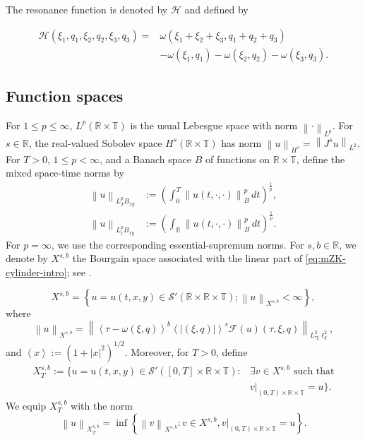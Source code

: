 \documentclass[12pt,oneside,reqno]{amsart}
\numberwithin{equation}{section}
\theoremstyle{plain}
\def\R{{\mathbb R}}
\def\T{{\mathbb T}}
\newcommand{\abs}[1]{%
    \left|#1\right|%
}
\newcommand{\norm}[1]{%
    \left\lVert #1\right\rVert%
}
\newcommand{\inp}[1]{%
    \left\langle #1\right\rangle
}
\newcommand{\brs}[1]{%
    \left\{#1\right\}
}
\newcommand{\Lpn}[2]{%
    \left\lVert #1\right\rVert_{L^{#2}}%
}
\newcommand{\Hn}[2]{%
    \left\lVert #1\right\rVert_{H^{#2}}%
}
\newcommand{\xnorm}[3]{%
    \left\lVert #1\right\rVert_{X^{{#2},{#3}}}%
}
\newcommand{\rt}{\R\times\T}
\newcommand{\rrt}{\R\times\R\times\T}
\newcommand{\F}{\mathcal{F}}
\begin{document}
\smallskip
The resonance function is denoted by $\mathcal{H}$ and defined by

\begin{equation}
    \begin{aligned}
\label{ResonanceFunction}
    \mathcal{H}(\xi_1,q_1,\xi_2,q_2,\xi_3, q_3)=& \omega(\xi_1 + \xi_2 +\xi_3,q_1 +q_2+q_3)\\
    & - \omega(\xi_1,q_1)-\omega( \xi_2,q_2) -\omega(\xi_3,q_3).
\end{aligned}
\end{equation}


\subsection{Function spaces}
For $1\leq p\leq\infty$, $L^p(\R\times\T)$ is the usual Lebesgue space
with norm $\Lpn{\cdot}{p}$. For $s\in\R$, the real-valued Sobolev space
$H^s(\R\times\T)$ has norm $\Hn{u}{s}=\Lpn{J^su}{2}$. For $T>0$,
$1\leq p<\infty$, and a Banach space $B$ of functions on $\R\times\T$,
define the mixed space-time norms by
\begin{equation}
\label{eq:mixed-space-time-norms}
\begin{aligned}
\norm{u}_{L_T^pB_{xy}}
&:=
\left(
    \int_0^T
    \norm{u(t,\cdot,\cdot)}_B^p
    \,dt
\right)^{\frac1p},
\\
\norm{u}_{L_t^pB_{xy}}
&:=
\left(
    \int_{\R}
    \norm{u(t,\cdot,\cdot)}_B^p
    \,dt
\right)^{\frac1p}.
\end{aligned}
\end{equation}
For $p=\infty$, we use the corresponding essential-supremum norms. For
$s,b\in\R$, we denote by $X^{s,b}$
the Bourgain space associated with the linear part of
\eqref{eq:mZK-cylinder-intro}; see \cite{bourgain1993fourier}.

$$X^{s,b}=\brs{ u=u(t,x,y)\in\mathcal{S}'(\rrt); \xnorm{u}{s}{b} <\infty},$$
where
$$\xnorm{u}{s}{b} = \norm{\inp{\tau -\omega(\xi,q)}^{b} \inp{\abs{(\xi,q)}}^{s} \F(u)(\tau,\xi,q)}_{  L^2_{\tau \xi} \ell_q^2},$$
and $\inp{x}:=(1+|x|^2)^{1/2}$. Moreover, for $T>0$, define
\begin{equation*}
\begin{aligned}
X_T^{s,b}:=
\Big\{u=u(t,x,y)\in\mathcal{S}'([0,T]\times\rt):{}
&\exists v\in X^{s,b}\text{ such that}\\
&v|_{(0,T)\times\R\times\T}=u
\Big\}.
\end{aligned}
\end{equation*}
We equip $X_T^{s,b}$ with the norm
$$\norm{u}_{X_T^{s,b}} = \inf \brs{\norm{v}_{X^{s,b}}: v\in X^{s,b}, v|_{(0,T) \times \R \times \T}=u}.$$
\end{document}
